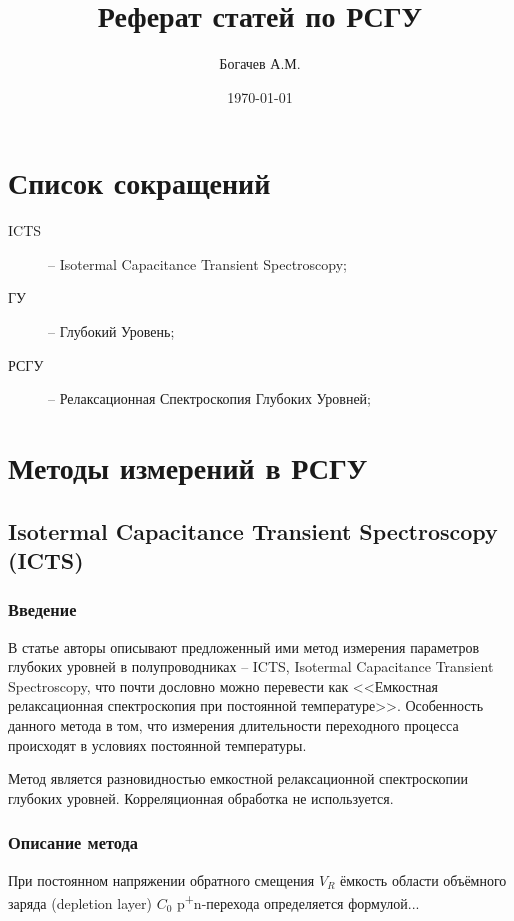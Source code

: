 \documentclass{report}
\title{Реферат статей по РСГУ}
\author{Богачев А.М.}
\date{\today}
\begin{document}
    \maketitle

    \chapter*{Список сокращений}
    \begin{description}
        \item[ICTS] -- Isotermal Capacitance Transient Spectroscopy;
        \item[ГУ] -- Глубокий Уровень;
        \item[РСГУ] -- Релаксационная Спектроскопия Глубоких Уровней;
    \end{description}


    \chapter{Методы измерений в РСГУ}

    \section{Isotermal Capacitance Transient Spectroscopy (ICTS)}
    \subsection{Введение}
    В статье \cite{Okushi_1981} авторы описывают предложенный ими метод 
    измерения параметров глубоких уровней в полупроводниках -- ICTS,
    Isotermal Capacitance Transient Spectroscopy, что почти дословно
    можно перевести как <<Емкостная релаксационная спектроскопия при 
    постоянной температуре>>. Особенность данного метода в том, что
    измерения длительности переходного процесса происходят в условиях
    постоянной температуры. 
    
    Метод является разновидностью емкостной релаксационной 
    спектроскопии глубоких уровней. Корреляционная обработка не 
    используется.

    
    
    \subsection{Описание метода}
    При постоянном напряжении обратного смещения $V_R$ ёмкость области
    объёмного заряда (depletion layer) $C_0$ p\textsuperscript{+}n-перехода
    определяется формулой...






    \printbibliography
\end{document}
